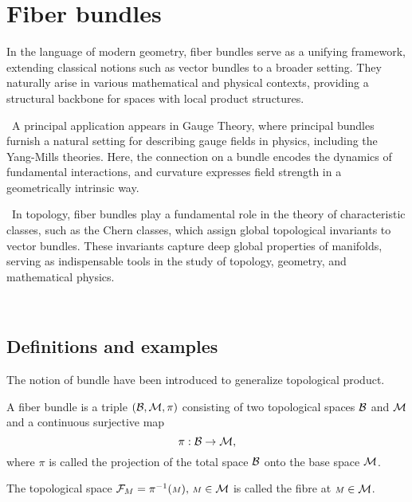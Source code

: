 \chapter{Fiber bundles}

In the language of modern geometry, fiber bundles serve as a unifying framework, extending classical notions such as vector bundles to a broader setting. They naturally arise in various mathematical and physical contexts, providing a structural backbone for spaces with local product structures.

\,
A principal application appears in Gauge Theory, where principal bundles furnish a natural setting for describing gauge fields in physics, including the Yang-Mills theories. Here, the connection on a bundle encodes the dynamics of fundamental interactions, and curvature expresses field strength in a geometrically intrinsic way.

\, 
In topology, fiber bundles play a fundamental role in the theory of characteristic classes, such as the Chern classes, which assign global topological invariants to vector bundles. These invariants capture deep global properties of manifolds, serving as indispensable tools in the study of topology, geometry, and mathematical physics.

\, 
\section{Definitions and examples}

The notion of bundle have been introduced to generalize topological product.

\begin{definition}
A fiber bundle is a triple $(\mathcal{B},\mathcal{M},\pi)$ consisting of two topological spaces
$\mathcal{B}$ and $\mathcal{M}$ and a continuous surjective map
\[
\pi:\mathcal{B} \to \mathcal{M},
\]
where $\pi$ is called the projection of the total space $\mathcal{B}$ onto the base space $\mathcal{M}$.
\end{definition}

\vspace{3pt}
The topological space $\mathcal{F}_{\scriptstyle M}= \pi^{-1}({\scriptstyle M}), \, {\scriptstyle M}\in \mathcal{M}$
 is called the fibre at ${\scriptstyle M}\in \mathcal{M}$.

\

